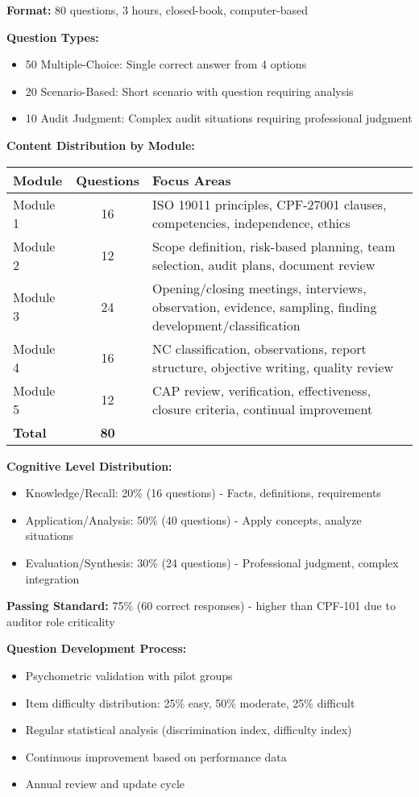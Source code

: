 \documentclass[11pt,a4paper]{article}
\begin{document}
\textbf{Format:} 80 questions, 3 hours, closed-book, computer-based

\textbf{Question Types:}
\begin{itemize}
\item 50 Multiple-Choice: Single correct answer from 4 options
\item 20 Scenario-Based: Short scenario with question requiring analysis
\item 10 Audit Judgment: Complex audit situations requiring professional judgment
\end{itemize}

\textbf{Content Distribution by Module:}

\begin{tabular}{|l|c|p{6cm}|}
\hline
\textbf{Module} & \textbf{Questions} & \textbf{Focus Areas} \\
\hline
Module 1 & 16 & ISO 19011 principles, CPF-27001 clauses, competencies, independence, ethics \\
Module 2 & 12 & Scope definition, risk-based planning, team selection, audit plans, document review \\
Module 3 & 24 & Opening/closing meetings, interviews, observation, evidence, sampling, finding development/classification \\
Module 4 & 16 & NC classification, observations, report structure, objective writing, quality review \\
Module 5 & 12 & CAP review, verification, effectiveness, closure criteria, continual improvement \\
\hline
\textbf{Total} & \textbf{80} & \\
\hline
\end{tabular}

\textbf{Cognitive Level Distribution:}
\begin{itemize}
\item Knowledge/Recall: 20\% (16 questions) - Facts, definitions, requirements
\item Application/Analysis: 50\% (40 questions) - Apply concepts, analyze situations
\item Evaluation/Synthesis: 30\% (24 questions) - Professional judgment, complex integration
\end{itemize}

\textbf{Passing Standard:} 75\% (60 correct responses) - higher than CPF-101 due to auditor role criticality

\textbf{Question Development Process:}
\begin{itemize}
\item Psychometric validation with pilot groups
\item Item difficulty distribution: 25\% easy, 50\% moderate, 25\% difficult
\item Regular statistical analysis (discrimination index, difficulty index)
\item Continuous improvement based on performance data
\item Annual review and update cycle
\end{itemize}
\end{document}
